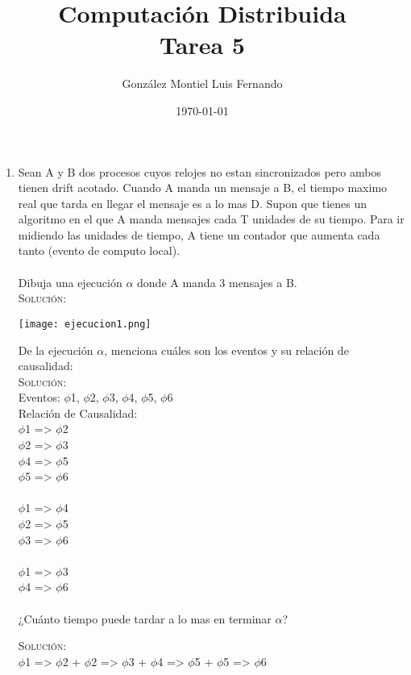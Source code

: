 \documentclass[letterpaper,10pt]{article}
\title{Computación Distribuida \\ Tarea 5}
\author{González Montiel Luis Fernando \\}
\date{\today}
\begin{document}
\maketitle

	\begin{enumerate}

    \item Sean A y B dos procesos cuyos relojes no estan sincronizados pero ambos tienen drift acotado.
     Cuando A manda un mensaje a B, el tiempo maximo real que tarda en llegar el mensaje es a lo mas D.
     Supon que tienes un algoritmo en el que A manda mensajes cada T unidades de su tiempo. 
     Para ir midiendo las unidades de tiempo, A tiene un contador que aumenta cada tanto 
     (evento de computo local).\\
     \\
     Dibuja una ejecución $\alpha$ donde A manda 3 mensajes a B.\\
     \textsc{Solución:}\\
     \begin{center}
     \texttt{[image: ejecucion1.png]}\\
     \end{center}
	 
	 De la ejecución $\alpha$, menciona cuáles son los eventos y su relación de causalidad:\\
	 \textsc{Solución:}
     \\
     Eventos: $\phi$1, $\phi$2, $\phi$3, $\phi$4, $\phi$5, $\phi$6\\
	Relación de Causalidad:\\
	$\phi$1 => $\phi$2\\
	$\phi$2 => $\phi$3\\
	$\phi$4 => $\phi$5\\
	$\phi$5 => $\phi$6\\
	\\
	$\phi$1 => $\phi$4\\
	$\phi$2 => $\phi$5\\
	$\phi$3 => $\phi$6\\
	\\
	$\phi$1 => $\phi$3\\
	$\phi$4 => $\phi$6\\
	\\
	¿Cuánto tiempo puede tardar a lo mas en terminar $\alpha$?

	 \textsc{Solución:}\\
	 $\phi$1 => $\phi$2 + $\phi$2 => $\phi$3 + $\phi$4 => $\phi$5 + $\phi$5 => $\phi$6 \\
 

\end{enumerate}
\end{document}

